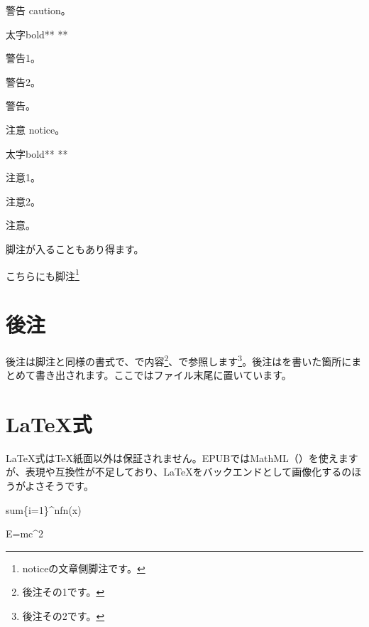 警告 caution。

太字bold**  **

警告1。  

警告2。

警告。  

注意 notice。

太字bold**  **

注意1。  

注意2。

注意。  

脚注が入ることもあり得ます。


こちらにも脚注\footnote{noticeの文章側脚注です。}

\section{後注}
\label{sec:2-2}

後注は脚注と同様の書式で、で内容\footnote{後注その1です。}、で参照します\footnote{後注その2です。}。後注はを書いた箇所にまとめて書き出されます。ここではファイル末尾に置いています。

\section{LaTeX式}
\label{sec:2-3}

LaTeX式はTeX紙面以外は保証されません。EPUBではMathML（）を使えますが、表現や互換性が不足しており、LaTeXをバックエンドとして画像化するのほうがよさそうです。

\textdollar{}\textdollar{} \reviewbackslash{}sum\textunderscore{}\{i=1\}\textasciicircum{}nf\textunderscore{}n(x) \textdollar{}\textdollar{}


\textdollar{}\textdollar{} E=mc\textasciicircum{}2 \textdollar{}\textdollar{}

